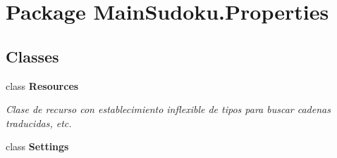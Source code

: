 \hypertarget{namespace_main_sudoku_1_1_properties}{\section{Package Main\-Sudoku.\-Properties}
\label{namespace_main_sudoku_1_1_properties}
}
\subsection*{Classes}
\begin{DoxyCompactItemize}
\item 
class {\bfseries Resources}
\begin{DoxyCompactList}\small\item\em Clase de recurso con establecimiento inflexible de tipos para buscar cadenas traducidas, etc. \end{DoxyCompactList}\item 
class {\bfseries Settings}
\end{DoxyCompactItemize}
